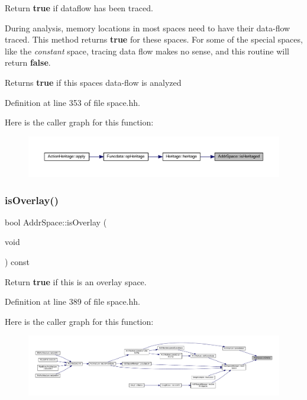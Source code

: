 Return {\bfseries{true}} if dataflow has been traced. 

During analysis, memory locations in most spaces need to have their data-\/flow traced. This method returns {\bfseries{true}} for these spaces. For some of the special spaces, like the {\itshape constant} space, tracing data flow makes no sense, and this routine will return {\bfseries{false}}. \begin{DoxyReturn}{Returns}
{\bfseries{true}} if this space\textquotesingle{}s data-\/flow is analyzed 
\end{DoxyReturn}


Definition at line 353 of file space.\+hh.

Here is the caller graph for this function\+:
\nopagebreak
\begin{figure}[H]
\begin{center}
\leavevmode
\includegraphics[width=350pt]{class_addr_space_a807313f845cda34701898ec89bad58cb_icgraph}
\end{center}
\end{figure}
\mbox{\label{class_addr_space_ad81b44bbbe7c6b561a7985aa23f3bd0d}} 
\subsubsection{\texorpdfstring{isOverlay()}{isOverlay()}}
{\footnotesize\ttfamily bool Addr\+Space\+::is\+Overlay (\begin{DoxyParamCaption}\item[{void}]{ }\end{DoxyParamCaption}) const\hspace{0.3cm}{\ttfamily [inline]}}



Return {\bfseries{true}} if this is an overlay space. 



Definition at line 389 of file space.\+hh.

Here is the caller graph for this function\+:
\nopagebreak
\begin{figure}[H]
\begin{center}
\leavevmode
\includegraphics[width=350pt]{class_addr_space_ad81b44bbbe7c6b561a7985aa23f3bd0d_icgraph}
\end{center}
\end{figure}
\mbox{\label{class_addr_space_a66dc51ca0c5b8f2061cbbec7446e71fc}} 
